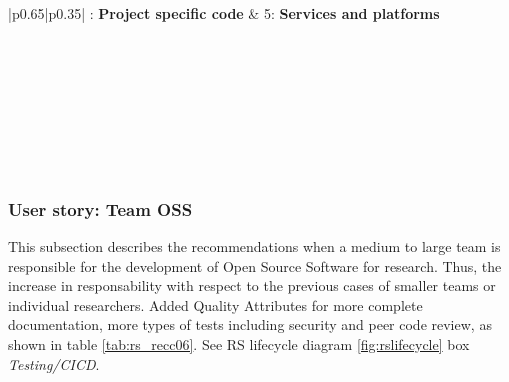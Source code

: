\begin{center}
    \tabletail{\hline}
    \label{tab:rs_recc05}
    \small
    \begin{supertabular}{|p{0.65\linewidth}|p{0.35\linewidth}|} : \textbf{Project specific code} &
    5: \textbf{Services and platforms} \\ \hline \hline

     \\ \hline
     \\ \hline
     \\ \hline
     \\ \hline
     \\ \hline
     \\ \hline
     \\ \hline

\end{supertabular}
\end{center}

\subsubsection{User story: Team OSS}

This subsection describes the recommendations when a medium to large team is responsible for the development of Open Source Software for research. Thus, the increase in responsability with respect to the previous cases of smaller teams or individual researchers. Added Quality Attributes for more complete documentation, more types of tests including security and peer code review, as shown in table \ref{tab:rs_recc06}. See RS lifecycle diagram \ref{fig:rslifecycle} box \textit{Testing/CICD}.

